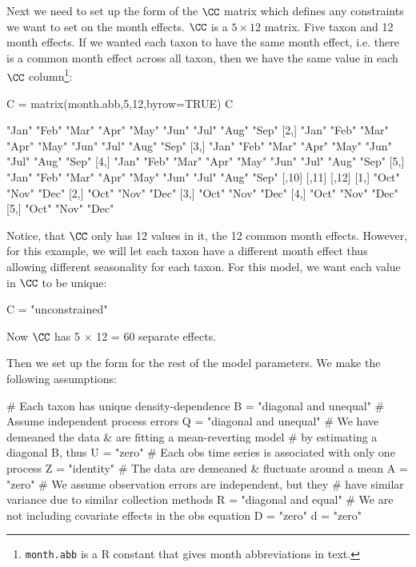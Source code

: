 Next we need to set up the form of the $\CC$ matrix which defines any constraints we want to set on the month effects.  $\CC$ is a $5 \times 12$ matrix. Five taxon and 12 month effects. 
If we wanted each taxon to have the same month effect, i.e. there is a common month effect across all taxon, then 
we have the same value in each $\CC$ column\footnote{\texttt{month.abb} is a R constant that gives month abbreviations in text.}:
\begin{Schunk}
\begin{Sinput}
 C = matrix(month.abb,5,12,byrow=TRUE)
 C
\end{Sinput}
\begin{Soutput}
     [,1]  [,2]  [,3]  [,4]  [,5]  [,6]  [,7]  [,8]  [,9] 
[1,] "Jan" "Feb" "Mar" "Apr" "May" "Jun" "Jul" "Aug" "Sep"
[2,] "Jan" "Feb" "Mar" "Apr" "May" "Jun" "Jul" "Aug" "Sep"
[3,] "Jan" "Feb" "Mar" "Apr" "May" "Jun" "Jul" "Aug" "Sep"
[4,] "Jan" "Feb" "Mar" "Apr" "May" "Jun" "Jul" "Aug" "Sep"
[5,] "Jan" "Feb" "Mar" "Apr" "May" "Jun" "Jul" "Aug" "Sep"
     [,10] [,11] [,12]
[1,] "Oct" "Nov" "Dec"
[2,] "Oct" "Nov" "Dec"
[3,] "Oct" "Nov" "Dec"
[4,] "Oct" "Nov" "Dec"
[5,] "Oct" "Nov" "Dec"
\end{Soutput}
\end{Schunk}
Notice, that $\CC$ only has 12 values in it, the 12 common month effects.
However, for this example, we will let each taxon have a different month effect thus allowing different seasonality for each taxon.  For this model, we want each value in $\CC$ to be unique:
\begin{Schunk}
\begin{Sinput}
 C = "unconstrained"
\end{Sinput}
\end{Schunk}
Now $\CC$ has 5 $\times$ 12 = 60 separate effects.

Then we set up the form for the rest of the model parameters.  We make the following assumptions:
\begin{Schunk}
\begin{Sinput}
 # Each taxon has unique density-dependence
 B = "diagonal and unequal"
 # Assume independent process errors
 Q = "diagonal and unequal"
 # We have demeaned the data & are fitting a mean-reverting model
 # by estimating a diagonal B, thus
 U = "zero"
 # Each obs time series is associated with only one process
 Z = "identity" 
 # The data are demeaned & fluctuate around a mean
 A = "zero" 
 # We assume observation errors are independent, but they
 # have similar variance due to similar collection methods
 R = "diagonal and equal"
 # We are not including covariate effects in the obs equation
 D = "zero"
 d = "zero"
\end{Sinput}
\end{Schunk}

